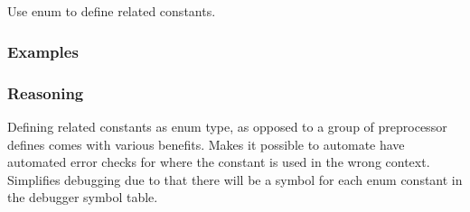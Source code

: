 \subsection*{\myRule{}}

Use enum to define related constants.

\subsubsection*{Examples}

\begin{minipage}[t]{0.47\linewidth}
    
\end{minipage}
\hfill
\begin{minipage}[t]{0.47\linewidth}
    
\end{minipage}

\subsubsection{Reasoning}

Defining related constants as enum type, as opposed to a group of preprocessor defines comes with various benefits. Makes it possible to automate have automated error checks for where the constant is used in the wrong context. Simplifies debugging due to that there will be a symbol for each enum constant in the debugger symbol table.
